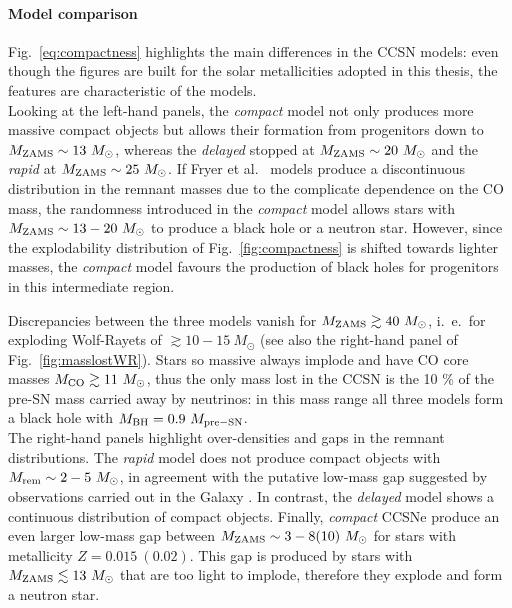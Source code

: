 \documentclass[a4paper,titlepage]{book}     	%
\newcommand{\sun}{\ensuremath{_\odot}}
\newcommand{\mzams}{M_\textup{ZAMS}}
\newcommand{\msun}{\ensuremath{M\sun}}
\begin{document}
\paragraph{Model comparison} Fig.\ \ref{eq:compactness} highlights the main differences in the CCSN models: even though the figures are built for the solar metallicities adopted in this thesis, the features are characteristic of the models.  \\

Looking at the left-hand panels, the \emph{compact} model not only produces more massive compact objects but allows their formation from progenitors down to $\mzams \sim 13~\msun$, whereas the \emph{delayed} stopped at $\mzams \sim 20~\msun$ and the \emph{rapid} at $\mzams \sim 25~\msun$. If Fryer et al.\ \cite{Fryer2012} models produce a discontinuous distribution in the remnant masses due to the complicate dependence on the CO mass, the randomness introduced in the \emph{compact} model allows stars with $\mzams \sim 13-20~\msun$ to produce a black hole or a neutron star. However, since the explodability distribution of Fig.\ \ref{fig:compactness} is shifted towards lighter masses, the \emph{compact} model favours the production of black holes for progenitors in this intermediate region. 

Discrepancies between the three models vanish for $\mzams \gtrsim 40~\msun$, i.\ e.\ for exploding Wolf-Rayets of $\gtrsim 10-15~\msun$ (see also the right-hand panel of Fig.\ \ref{fig:masslostWR}). Stars so massive always implode and have CO core masses $M_{\rm CO} \gtrsim 11~\msun$, thus the only mass lost in the CCSN is the 10 \% of the pre-SN mass carried away by neutrinos: in this mass range all three models form a black hole with $M_{\rm BH} = 0.9~M_{\rm pre-SN}$.\\

The right-hand panels highlight over-densities and gaps in the remnant distributions. The \emph{rapid} model does not produce compact objects with $M_{\rm rem} \sim 2-5~\msun$, in agreement with the putative low-mass gap suggested by observations carried out in the Galaxy \cite{massgapreal_ozel2010}. In contrast, the \emph{delayed} model shows a continuous distribution of compact objects. Finally, \emph{compact} CCSNe produce an even larger low-mass gap between $\mzams \sim 3-8(10)~\msun $ for stars with metallicity $Z=0.015~(0.02)$. This gap is produced by stars with $\mzams \lesssim 13~\msun$ that are too light to implode, therefore they explode and form a neutron star.
\end{document}
